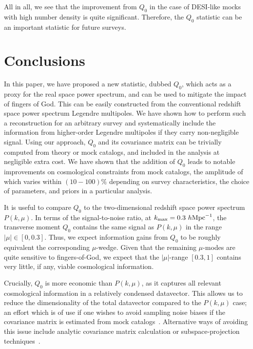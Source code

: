 \documentclass[12pt,a4paper]{article}
\newcommand\hMpc{h\text{Mpc}^{-1}}
\begin{document}
All in all, we see that the improvement 
from $Q_0$
in the case of DESI-like mocks
with high number density is 
quite significant. 
Therefore, the $Q_0$ statistic can be an important 
statistic for future surveys. 




\section{Conclusions}
\label{sec:disc}

In this paper, we have proposed a new statistic, dubbed $Q_0$, which acts as a proxy for the real space power spectrum, and can be used to mitigate the impact of fingers of God.
This can be easily constructed
from the conventional redshift space power spectrum Legendre multipoles.
We have shown how to perform such a reconstruction 
for an arbitrary survey and systematically include 
the information from higher-order Legendre multipoles
if they carry non-negligible signal. 
Using our approach, $Q_0$ and its covariance matrix 
can be trivially computed from theory or mock catalogs,
and included in the analysis at negligible extra cost. 
We have shown that the addition of $Q_0$ leads to notable improvements
on cosmological constraints from mock catalogs, the amplitude of which varies within $(10-100)\%$ depending 
on survey characteristics, the choice of parameters, and priors in a particular analysis.

It is useful to compare $Q_0$ to the two-dimensional redshift space power spectrum $P(k,\mu)$. 
In terms of the signal-to-noise ratio, at $k_{\rm max}=0.3~\hMpc$, the transverse moment $Q_0$ 
contains the same signal as $P(k,\mu)$ in the range $|\mu| \in [0,0.3]$. 
Thus, we expect information gains from $Q_0$ to be roughly equivalent the corresponding $\mu$-wedge.
Given that the remaining $\mu$-modes
are quite sensitive to fingers-of-God, we expect that the $|\mu|$-range $[0.3,1]$ 
contains very little, if any, viable cosmological information. 



Crucially, 
$Q_0$ is more economic than $P(k,\mu)$, as it captures all relevant cosmological
information in a relatively condensed datavector. This allows us to reduce the dimensionality of the
total datavector compared to the $P(k,\mu)$ case; an effort which is of use if one wishes to avoid sampling noise 
biases if the covariance matrix is estimated from mock catalogs~\cite{Percival:2013sga}.
Alternative ways of avoiding this issue include analytic covariance matrix calculation \cite{Wadekar:2019rdu,Wadekar:2020hax} or subspace-projection techniques~\cite{Philcox:2020zyp}.
\end{document}

